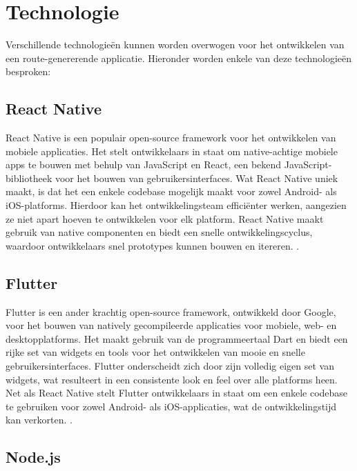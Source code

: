     \section{Technologie}


    Verschillende technologieën kunnen worden overwogen voor het ontwikkelen van een route-genererende applicatie. Hieronder worden enkele van deze technologieën besproken:

    \subsection{React Native}

    React Native is een populair open-source framework voor het ontwikkelen van mobiele applicaties. 
    Het stelt ontwikkelaars in staat om native-achtige mobiele apps te bouwen met behulp van JavaScript en React, een bekend JavaScript-bibliotheek voor het bouwen van gebruikersinterfaces. 
    Wat React Native uniek maakt, is dat het een enkele codebase mogelijk maakt voor zowel Android- als iOS-platforms. Hierdoor kan het ontwikkelingsteam efficiënter werken, 
    aangezien ze niet apart hoeven te ontwikkelen voor elk platform. React Native maakt gebruik van native componenten en biedt een snelle ontwikkelingscyclus, 
    waardoor ontwikkelaars snel prototypes kunnen bouwen en itereren. \autocite{react_native_docs}.

    \subsection{Flutter}
    
    Flutter is een ander krachtig open-source framework, ontwikkeld door Google, voor het bouwen van natively gecompileerde applicaties voor mobiele, web- en desktopplatforms. 
    Het maakt gebruik van de programmeertaal Dart en biedt een rijke set van widgets en tools voor het ontwikkelen van mooie en snelle gebruikersinterfaces. 
    Flutter onderscheidt zich door zijn volledig eigen set van widgets, wat resulteert in een consistente look en feel over alle platforms heen. 
    Net als React Native stelt Flutter ontwikkelaars in staat om een enkele codebase te gebruiken voor zowel Android- als iOS-applicaties, wat de ontwikkelingstijd kan verkorten. \autocite{flutter_docs}.

    \subsection{Node.js}
    

